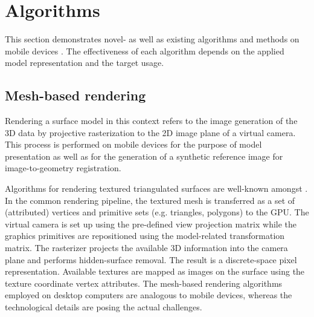 \documentclass[review]{elsarticle}
\begin{document}

\section{Algorithms}
\label{sec:algorithms}

This section demonstrates novel- as well as existing algorithms and methods on mobile devices . The effectiveness of each algorithm depends on the applied model representation and the target usage.

\subsection{Mesh-based rendering}
\label{sec:algorithms:mesh_rendering}

Rendering a surface model in this context refers to the image generation of the 3D  data by projective rasterization to the 2D image plane of a virtual camera. This process is performed on mobile devices for the purpose of model presentation as well as for the generation of a synthetic reference image for image-to-geometry registration.

Algorithms for rendering textured triangulated surfaces are well-known amongst . In the common rendering pipeline, the textured mesh is transferred as a set of (attributed) vertices and primitive sets (e.g. triangles, polygons) to the \gls{GPU}. The virtual camera is set up using the pre-defined view projection matrix while the graphics primitives are repositioned using the model-related transformation matrix. The rasterizer projects the available 3D information into the camera plane and performs hidden-surface removal. The result is a discrete-space pixel representation. Available textures are mapped as images on the surface using the texture coordinate vertex attributes. The mesh-based rendering algorithms employed on desktop computers are analogous to mobile devices, whereas the technological details are posing the actual challenges.
\end{document}
